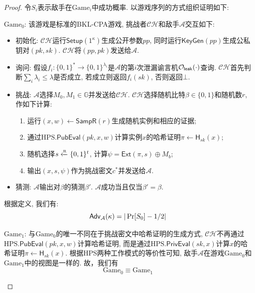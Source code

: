 \begin{proof}
令$S_i$表示敌手在$\text{Game}_i$中成功概率. 以游戏序列的方式组织证明如下: 

\begin{trivlist}
\item $\text{Game}_0$: 该游戏是标准的BKL-CPA游戏, 挑战者$\mathcal{CH}$和敌手$\mathcal{A}$交互如下: 
\begin{itemize}
\item 初始化: $\mathcal{CH}$运行$\mathsf{Setup}(1^\kappa)$生成公开参数$pp$, 
		同时运行$\mathsf{KeyGen}(pp)$生成公私钥对$(pk, sk)$. $\mathcal{CH}$将$(pp, pk)$发送给$\mathcal{A}$. 

\item 询问: 假设$f_i: \{0, 1\}^*\rightarrow\{0, 1\}^{\lambda_i}$是$\mathcal{A}$的第$i$次泄漏谕言机$\mathcal{O}_\mathsf{leak}(\cdot)$查询. $\mathcal{CH}$首先判断$\sum_i\lambda_i\leq \lambda$是否成立, 若成立则返回$f_i(sk)$, 否则返回$\bot$.  

\item 挑战: $\mathcal{A}$选择$M_0, M_1 \in \mathbb{G}$并发送给$\mathcal{CH}$. $\mathcal{CH}$选择随机比特$\beta \in \{0,1\}$和随机数$r$, 作如下计算:
\begin{enumerate}
    \item 运行$(x, w) \leftarrow \mathsf{SampR}(r)$生成随机实例和相应的证据;
    \item 通过$\text{HPS}.\mathsf{PubEval}(pk, x, w)$计算实例$x$的哈希证明$\pi \leftarrow \mathsf{H}_{sk}(x)$; 
    \item 随机选择$s \xleftarrow{\textup{\tiny R}} \{0, 1\}^t$, 计算$\psi=\mathsf{Ext}(\pi, s)\oplus M_b$;
    \item 输出$(x, s, \psi)$作为挑战密文$c^*$并发送给$\mathcal{A}$. 
\end{enumerate} 

\item 猜测: $\mathcal{A}$输出对$\beta$的猜测$\beta'$. $\mathcal{A}$成功当且仅当$\beta' = \beta$. 
\end{itemize} 
根据定义, 我们有: 
\begin{equation*}
	\mathsf{Adv}_\mathcal{A}(\kappa) = |\Pr[S_0] - 1/2|
\end{equation*}

\item $\text{Game}_1$: 与$\text{Game}_0$的唯一不同在于挑战密文中哈希证明的生成方式, 
	$\mathcal{CH}$不再通过$\text{HPS}.\mathsf{PubEval}(pk, x, w)$计算哈希证明, 而是通过$\text{HPS}.\mathsf{PrivEval}(sk, x)$计算$x$的哈希证明$\pi \leftarrow \mathsf{H}_{sk}(x)$. 根据HPS两种工作模式的等价性可知, 敌手$\mathcal{A}$在游戏$\text{Game}_0$和$\text{Game}_1$中的视图是一样的. 故，我们有
    \begin{equation*}
        \text{Game}_0 \equiv \text{Game}_1
    \end{equation*}


\end{trivlist}
\end{proof}
